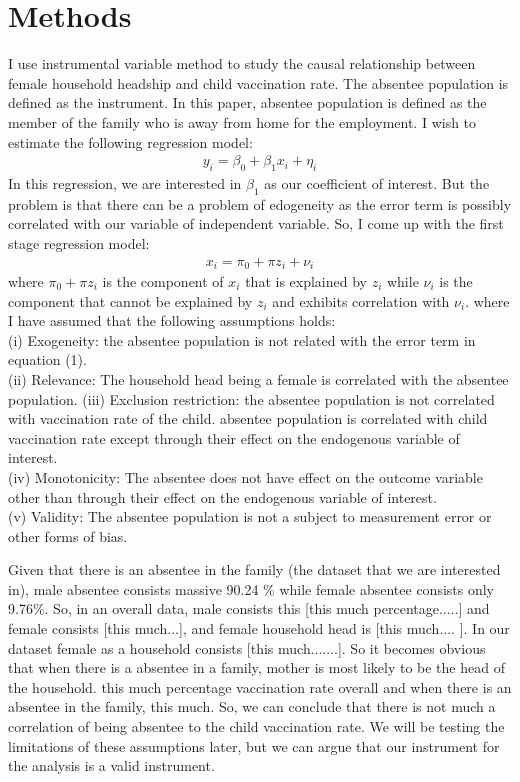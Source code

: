 \documentclass[12pt]{article}
\begin{document}
\section{Methods}
I use instrumental variable method to study the causal relationship between female household headship and child vaccination rate. The absentee population is defined as the instrument. In this paper, absentee population is defined as the member of the family who is away from home for the employment. I wish to estimate the following regression model:
\begin{align}
    y_i = \beta_0 + \beta_1 x_i + \eta_i
\end{align}
In this regression, we are interested in $\beta_1$ as our coefficient of interest. But the problem is that there can be a problem of edogeneity as the error term is possibly correlated with our variable of independent variable. So, I come up with the first stage regression model:
\begin{align}
    x_i = \pi_0 + \pi z_i + \nu_i
\end{align}
where $\pi_0 + \pi z_i$ is the component of $x_i$ that is explained by $z_i$ while $\nu_i$ is the component that cannot be explained by $z_i$ and exhibits correlation with $\nu_i$.
where I have assumed that the following assumptions holds:\\
(i) Exogeneity: the absentee population is not related with the error term in equation (1).\\
(ii) Relevance: The household head being a female is correlated with the absentee population.
(iii) Exclusion restriction: the absentee population is not correlated with vaccination rate of the child. absentee population is correlated with child vaccination rate except through their effect on the endogenous variable of interest.\\
(iv) Monotonicity: The absentee does not have effect on the outcome variable other than through their effect on the endogenous variable of interest.\\
(v) Validity: The absentee population is not a subject to measurement error or other forms of bias.

Given that there is an absentee in the family (the dataset that we are interested in), male absentee consists massive 90.24 \% while female absentee consists only 9.76\%. So, in an overall data, male consists this [this much percentage.....] and female consists [this much...], and female household head is [this much.... ]. In our dataset female as a household consists [this much.......]. So it becomes obvious that when there is a absentee in a family, mother is most likely to be the head of the household. {this much percentage vaccination rate overall and when there is an absentee in the family, this much}. So, we can conclude that there is not much a correlation of being absentee to the child vaccination rate. We will be testing the limitations of these assumptions later, but we can argue that our instrument for the analysis is a valid instrument.
\end{document}
